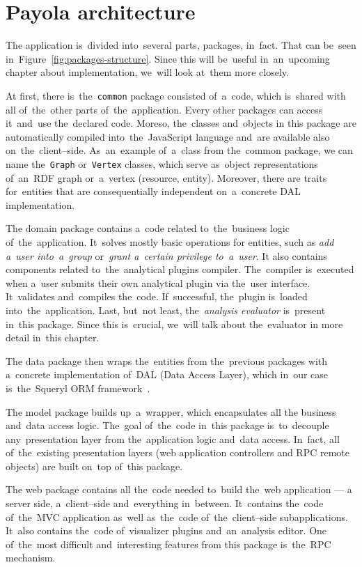 \section{Payola architecture}
The application is~divided into~several parts, packages, in~fact. That can be~seen in~Figure~\ref{fig:packages-structure}. Since this will be~useful in~an~upcoming
chapter about implementation, we~will look at~them more closely.

At first, there is~the~\texttt{common} package consisted of~a~code, which is~shared with all of~the~other parts of~the~application. Every other packages can 
access it~and~use the~declared code. Moreso, the~classes and~objects 
in this package are automatically compiled into~the~JavaScript language and~are available
also on~the~client--side. As~an~example of~a~class from the~common package, we
can name the~\texttt{Graph} or~\texttt{Vertex} classes, which serve as~object representations
of~an~RDF graph or~a~vertex (resource, entity). Moreover, there are traits for~entities that are consequentially independent on~a~concrete DAL implementation.

The domain package contains a~code related to~the~business logic of~the~application. It~solves mostly basic operations for entities, such as
\emph{add a~user into~a~group} or~\emph{grant a~certain privilege to~a~user}.
It also contains components related to~the~analytical plugins compiler. The~compiler is~executed when a~user submits their own analytical plugin via the~user 
interface. It~validates and~compiles the~code. If~successful, the~plugin is~loaded into~the~application. Last, but~not least, the~\emph{analysis evaluator} is~present in~this package.
Since this is~crucial, we~will talk about the~evaluator
in more detail in~this chapter.

\begin{sloppypar}
The data package then wraps the~entities from the~previous packages with
a~concrete implementation of~DAL (Data Access Layer), which in~our case is~the~Squeryl
ORM framework~\cite{squeryl}.
\end{sloppypar}

The model package builds up~a~wrapper, which encapsulates all the
business and~data access logic. The~goal of~the~code in~this package is~to~decouple
any~presentation layer from the~application logic and~data access. In~fact,
all of~the~existing presentation layers (web application controllers and
RPC remote objects) are built on~top of~this package. 

The web package contains all the~code needed to~build the~web application --- 
a server side, a~client--side and~everything in~between. It~contains the~code of~the~MVC application as~well as~the~code of~the~client--side subapplications.
It~also contains the~code of~visualizer plugins and~an~analysis editor. One of~the~most difficult and~interesting features from this package is~the~RPC mechanism.

